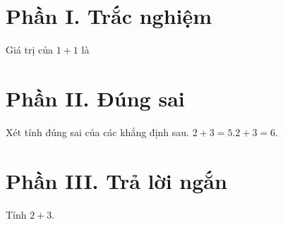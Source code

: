 \section*{Phần I. Trắc nghiệm}
\begin{ex}
Giá trị của $1+1$ là
\end{ex}

\section*{Phần II. Đúng sai}
\begin{ex}
Xét tính đúng sai của các khẳng định sau.
{\True $2+3=5$.}{$2+3=6$.}
\end{ex}

\section*{Phần III. Trả lời ngắn}
\begin{ex}
Tính $2+3$.
\end{ex}
